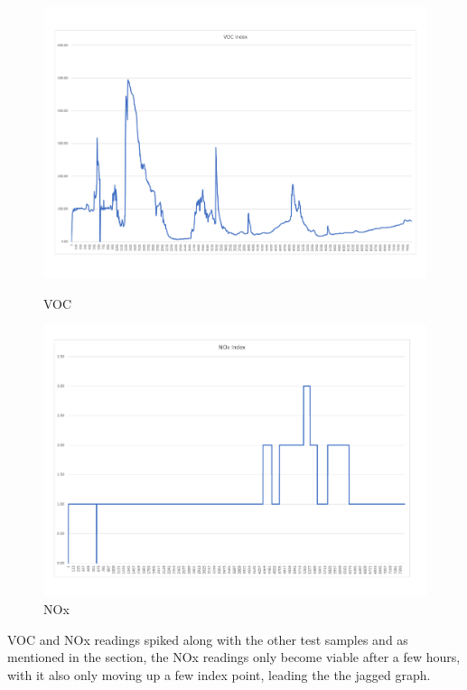 \begin{figure}[!htb]
	\includegraphics[width=\linewidth]{body/fig/VOC.pdf}
	\caption{VOC}\label{fig:voc}
	\endminipage\hfill
	\includegraphics[width=\linewidth]{body/fig/NOX.pdf}
	\caption{NOx}\label{fig:nox}
	\endminipage\hfill

\end{figure}

\noindent
VOC and NOx readings spiked along with the other test samples and as mentioned in the section, the NOx readings only become viable after a few hours, with it also only moving up a few index point, leading the the jagged graph.


%	
